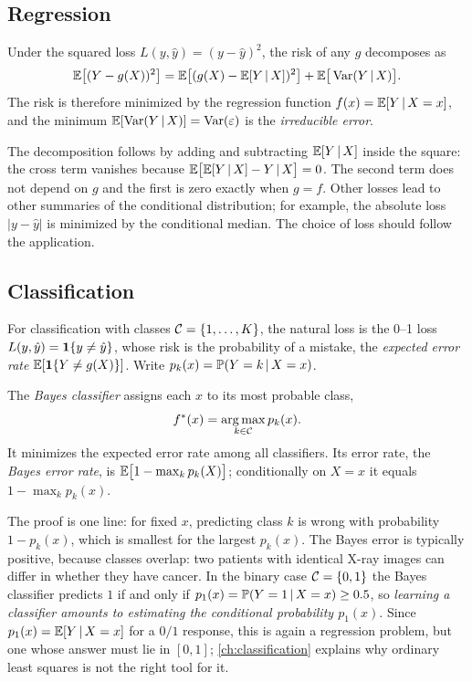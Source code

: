\subsection{Regression}

\begin{proposition}\label{prop:best-regression}
Under the squared loss $L(y,\hat y)=(y-\hat y)^2$, the risk of any $g$ decomposes as
\[
\mathbb{E}\big[(Y-g(X))^2\big]=\mathbb{E}\big[(g(X)-\mathbb{E}[Y\,|\, X])^2\big]+\mathbb{E}\big[\operatorname{Var}(Y\,|\, X)\big].
\]
The risk is therefore minimized by the regression function $f(x)=\mathbb{E}[Y\,|\, X=x]$, and the minimum $\mathbb{E}[\operatorname{Var}(Y\,|\, X)]=\operatorname{Var}(\varepsilon)$ is the \emph{irreducible error}.
\end{proposition}

The decomposition follows by adding and subtracting $\mathbb{E}[Y\,|\, X]$ inside the square: the cross term vanishes because $\mathbb{E}\big[\mathbb{E}[Y\,|\, X]-Y\,|\, X\big]=0$. The second term does not depend on $g$ and the first is zero exactly when $g=f$. Other losses lead to other summaries of the conditional distribution; for example, the absolute loss $\lvert y-\hat y\rvert$ is minimized by the conditional median. The choice of loss should follow the application.

\subsection{Classification}

For classification with classes $\mathcal{C}=\{1,\dots,K\}$, the natural loss is the 0--1 loss $L(y,\hat y)=\mathbf{1}\{y\ne\hat y\}$, whose risk is the probability of a mistake, the \emph{expected error rate} $\mathbb{E}[\mathbf{1}\{Y\ne g(X)\}]$. Write $p_k(x)=\mathbb{P}(Y=k\,|\, X=x)$.

\begin{definition}\label{def:bayes-classifier}
The \emph{Bayes classifier} assigns each $x$ to its most probable class,
\[
f^*(x)=\operatorname*{arg\,max}_{k\in\mathcal{C}}p_k(x).
\]
It minimizes the expected error rate among all classifiers. Its error rate, the \emph{Bayes error rate}, is $\mathbb{E}\big[1-\max_kp_k(X)\big]$; conditionally on $X=x$ it equals $1-\max_kp_k(x)$.
\end{definition}

The proof is one line: for fixed $x$, predicting class $k$ is wrong with probability $1-p_k(x)$, which is smallest for the largest $p_k(x)$. The Bayes error is typically positive, because classes overlap: two patients with identical X-ray images can differ in whether they have cancer. In the binary case $\mathcal{C}=\{0,1\}$ the Bayes classifier predicts $1$ if and only if $p_1(x)=\mathbb{P}(Y=1\,|\, X=x)\ge0.5$, so \emph{learning a classifier amounts to estimating the conditional probability $p_1(x)$}. Since $p_1(x)=\mathbb{E}[Y\,|\, X=x]$ for a $0/1$ response, this is again a regression problem, but one whose answer must lie in $[0,1]$; \cref{ch:classification} explains why ordinary least squares is not the right tool for it.

